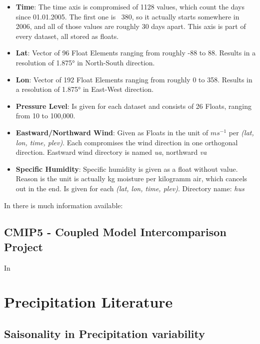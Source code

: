 \begin{itemize}
  \item \textbf{Time}: The time axis is  compromised of 1128 values, which count the days since 01.01.2005. The first one is ~380, so it actually starts somewhere in 2006, and all of those values are roughly 30 days apart. This axis is part of every dataset, all stored as floats.
  \item \textbf{Lat}: Vector of 96 Float Elements ranging from roughly -88 to 88. Results in a resolution of 1.875° in North-South direction.
  \item \textbf{Lon}: Vector of 192 Float Elements ranging from roughly 0 to 358. Results in a resolution of 1.875° in East-West direction. 
  \item \textbf{Pressure Level}: Is given for each dataset and consists of 26 Floats, ranging from 10 to 100,000. 
  \item \textbf{Eastward/Northward Wind}: Given as Floats in the unit of $ms^{-1}$ per \textit{(lat, lon, time, plev)}. Each compromises the wind direction in one orthogonal direction. Eastward wind directory is named \textit{ua}, northward \textit{va}  
  \item \textbf{Specific Humidity}: Specific humidity is given as a float without value. Reason is the unit is actually kg moisture per kilogramm air, which cancels out in the end. Is given for each \textit{(lat, lon, time, plev)}. Directory name: \textit{hus}
	
\end{itemize}



In \cite{mpige} there is much information available:




\subsection{CMIP5 - Coupled Model Intercomparison Project}

In \cite{taylor2012overview_cmip5}


\section{Precipitation Literature}

\subsection{Saisonality in Precipitation variability}


